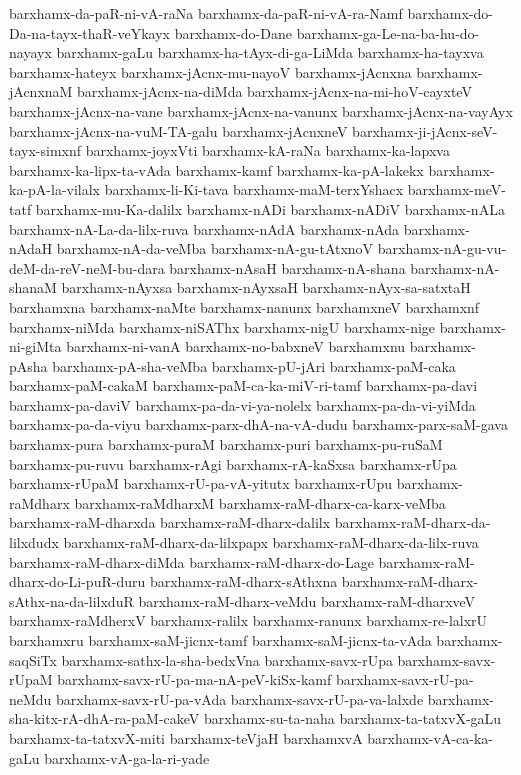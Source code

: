 {barxhamx-da-paR-ni-vA-raNa
barxhamx-da-paR-ni-vA-ra-Namf
barxhamx-do-Da-na-tayx-thaR-veYkayx
barxhamx-do-Dane
barxhamx-ga-Le-na-ba-hu-do-nayayx
barxhamx-gaLu
barxhamx-ha-tAyx-di-ga-LiMda
barxhamx-ha-tayxva
barxhamx-hateyx
barxhamx-jAcnx-mu-nayoV
barxhamx-jAcnxna
barxhamx-jAcnxnaM
barxhamx-jAcnx-na-diMda
barxhamx-jAcnx-na-mi-hoV-cayxteV
barxhamx-jAcnx-na-vane
barxhamx-jAcnx-na-vanunx
barxhamx-jAcnx-na-vayAyx
barxhamx-jAcnx-na-vuM-TA-galu
barxhamx-jAcnxneV
barxhamx-ji-jAcnx-seV-tayx-simxnf
barxhamx-joyxVti
barxhamx-kA-raNa
barxhamx-ka-lapxva
barxhamx-ka-lipx-ta-vAda
barxhamx-kamf
barxhamx-ka-pA-lakekx
barxhamx-ka-pA-la-vilalx
barxhamx-li-Ki-tava
barxhamx-maM-terxYshacx
barxhamx-meV-tatf
barxhamx-mu-Ka-dalilx
barxhamx-nADi
barxhamx-nADiV
barxhamx-nALa
barxhamx-nA-La-da-lilx-ruva
barxhamx-nAdA
barxhamx-nAda
barxhamx-nAdaH
barxhamx-nA-da-veMba
barxhamx-nA-gu-tAtxnoV
barxhamx-nA-gu-vu-deM-da-reV-neM-bu-dara
barxhamx-nAsaH
barxhamx-nA-shana
barxhamx-nA-shanaM
barxhamx-nAyxsa
barxhamx-nAyxsaH
barxhamx-nAyx-sa-satxtaH
barxhamxna
barxhamx-naMte
barxhamx-nanunx
barxhamxneV
barxhamxnf
barxhamx-niMda
barxhamx-niSAThx
barxhamx-nigU
barxhamx-nige
barxhamx-ni-giMta
barxhamx-ni-vanA
barxhamx-no-babxneV
barxhamxnu
barxhamx-pAsha
barxhamx-pA-sha-veMba
barxhamx-pU-jAri
barxhamx-paM-caka
barxhamx-paM-cakaM
barxhamx-paM-ca-ka-miV-ri-tamf
barxhamx-pa-davi
barxhamx-pa-daviV
barxhamx-pa-da-vi-ya-nolelx
barxhamx-pa-da-vi-yiMda
barxhamx-pa-da-viyu
barxhamx-parx-dhA-na-vA-dudu
barxhamx-parx-saM-gava
barxhamx-pura
barxhamx-puraM
barxhamx-puri
barxhamx-pu-ruSaM
barxhamx-pu-ruvu
barxhamx-rAgi
barxhamx-rA-kaSxsa
barxhamx-rUpa
barxhamx-rUpaM
barxhamx-rU-pa-vA-yitutx
barxhamx-rUpu
barxhamx-raMdharx
barxhamx-raMdharxM
barxhamx-raM-dharx-ca-karx-veMba
barxhamx-raM-dharxda
barxhamx-raM-dharx-dalilx
barxhamx-raM-dharx-da-lilxdudx
barxhamx-raM-dharx-da-lilxpapx
barxhamx-raM-dharx-da-lilx-ruva
barxhamx-raM-dharx-diMda
barxhamx-raM-dharx-do-Lage
barxhamx-raM-dharx-do-Li-puR-duru
barxhamx-raM-dharx-sAthxna
barxhamx-raM-dharx-sAthx-na-da-lilxduR
barxhamx-raM-dharx-veMdu
barxhamx-raM-dharxveV
barxhamx-raMdherxV
barxhamx-ralilx
barxhamx-ranunx
barxhamx-re-lalxrU
barxhamxru
barxhamx-saM-jicnx-tamf
barxhamx-saM-jicnx-ta-vAda
barxhamx-saqSiTx
barxhamx-sathx-la-sha-bedxVna
barxhamx-savx-rUpa
barxhamx-savx-rUpaM
barxhamx-savx-rU-pa-ma-nA-peV-kiSx-kamf
barxhamx-savx-rU-pa-neMdu
barxhamx-savx-rU-pa-vAda
barxhamx-savx-rU-pa-va-lalxde
barxhamx-sha-kitx-rA-dhA-ra-paM-cakeV
barxhamx-su-ta-naha
barxhamx-ta-tatxvX-gaLu
barxhamx-ta-tatxvX-miti
barxhamx-teVjaH
barxhamxvA
barxhamx-vA-ca-ka-gaLu
barxhamx-vA-ga-la-ri-yade
}
